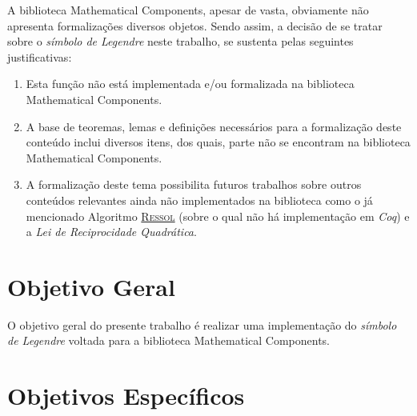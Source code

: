 A biblioteca Mathematical Components, apesar de vasta, obviamente não apresenta formalizações diversos objetos. Sendo assim, a decisão de se tratar sobre o \textit{símbolo de Legendre} neste trabalho, se sustenta pelas seguintes justificativas:
\begin{enumerate}
    \item Esta função não está implementada e/ou formalizada na biblioteca Mathematical Components.
    \item A base de teoremas, lemas e definições necessários para a formalização deste conteúdo inclui diversos itens, dos quais, parte não se encontram na biblioteca Mathematical Components.
    \item A formalização deste tema possibilita futuros trabalhos sobre outros conteúdos relevantes ainda não implementados na biblioteca como o já mencionado Algoritmo \hyperref[algo:ressol]{\textsc{Ressol}} (sobre o qual não há implementação em \textit{Coq}) e a \textit{Lei de Reciprocidade Quadrática}. 
    
\end{enumerate}

\section{Objetivo Geral}

O objetivo geral do presente trabalho é realizar uma implementação do \textit{símbolo de Legendre} voltada para a biblioteca Mathematical Components.

\section{Objetivos Específicos} \label{sec:obj-esp}

